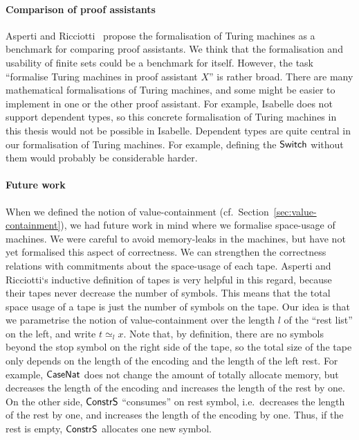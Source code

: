 \paragraph{Comparison of proof assistants}
Asperti and Ricciotti~\cite{asperti2015} propose the formalisation of Turing machines as a benchmark for comparing proof assistants.  We think that
the formalisation and usability of finite sets could be a benchmark for itself.  However, the task ``formalise Turing machines in proof assistant
$X$'' is rather broad.  There are many mathematical formalisations of Turing machines, and some might be easier to implement in one or the other proof
assistant.  For example, Isabelle does not support dependent types, so this concrete formalisation of Turing machines in this thesis would not be
possible in Isabelle.  Dependent types are quite central in our formalisation of Turing machines.  For example, defining the $\mathsf{Switch}$ without them
would probably be considerable harder.



\paragraph{Future work}
When we defined the notion of value-containment (cf.~Section~\ref{sec:value-containment}), we had future work in mind where we formalise space-usage
of machines.  We were careful to avoid memory-leaks in the machines, but have not yet formalised this aspect of correctness.  We can strengthen the
correctness relations with commitments about the space-usage of each tape.  Asperti and Ricciotti`s inductive definition of tapes is very helpful in
this regard, because their tapes never decrease the number of symbols.  This means that the total space usage of a tape is just the number of symbols
on the tape.  Our idea is that we parametrise the notion of value-containment over the length $l$ of the ``rest list'' on the left, and write
$t \simeq_{l} x$.  Note that, by definition, there are no symbols beyond the stop symbol on the right side of the tape, so the total size of the tape
only depends on the length of the encoding and the length of the left rest.  For example, $\mathsf{CaseNat}$ does not change the amount of totally
allocate memory, but decreases the length of the encoding and increases the length of the rest by one.  On the other side, $\mathsf{ConstrS}$ ``consumes''
on rest symbol, i.e.\ decreases the length of the rest by one, and increases the length of the encoding by one.  Thus, if the rest is empty,
$\mathsf{ConstrS}$ allocates one new symbol.

